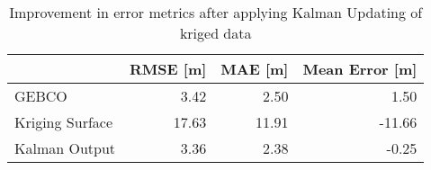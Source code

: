 \begin{table}
\centering
\caption{Improvement in error metrics after applying Kalman Updating of kriged data}
\label{tab:oahu5_gebco_raster_error}
\begin{tabular}{lrrr}
\toprule
 & RMSE [m] & MAE [m] & Mean Error [m] \\
\midrule
GEBCO & 3.42 & 2.50 & 1.50 \\
Kriging Surface & 17.63 & 11.91 & -11.66 \\
Kalman Output & 3.36 & 2.38 & -0.25 \\
\bottomrule
\end{tabular}
\end{table}
